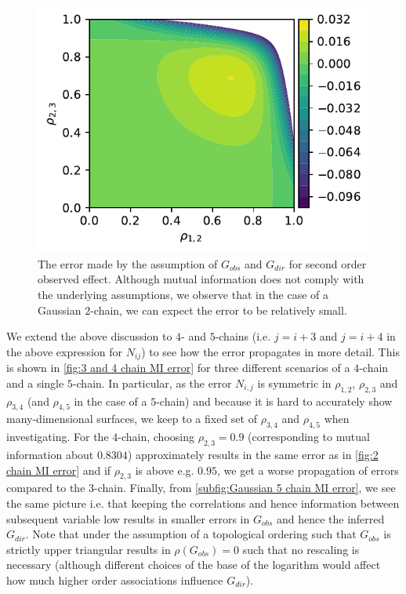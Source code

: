 \documentclass[../Thesis.tex]{subfiles}
\begin{document}
\begin{figure}[H]
    \centering
    \includegraphics[width=.7\linewidth]{figures/Gaussian Chain Theoretical/2 chain error - MI.pdf}
    \caption{The error made by the assumption of $G_{obs}$ and $G_{dir}$ for second order observed effect. Although mutual information does not comply with the underlying assumptions, we observe that in the case of a Gaussian $2$-chain, we can expect the error to be relatively small.}
    \label{fig:2 chain MI error}
\end{figure}

We extend the above discussion to $4$- and $5$-chains (i.e. $j = i + 3$ and $j = i + 4$ in the above expression for $N_{ij}$) to see how the error propagates in more detail. This is shown in \autoref{fig:3 and 4 chain MI error} for three different scenarios of a $4$-chain and a single $5$-chain. In particular, as the error $N_{i,j}$ is symmetric in $\rho_{1,2}$, $\rho_{2,3}$ and $\rho_{3,4}$ (and $\rho_{4,5}$ in the case of a $5$-chain) and because it is hard to accurately show many-dimensional surfaces, we keep to a fixed set of $\rho_{3,4}$ and $\rho_{4,5}$ when investigating. For the $4$-chain, choosing $\rho_{2,3} = 0.9$ (corresponding to mutual information about $0.8304$) approximately results in the same error as in \autoref{fig:2 chain MI error} and if $\rho_{2,3}$ is above e.g. $0.95$, we get a worse propagation of errors compared to the $3$-chain. Finally, from \autoref{subfig:Gaussian 5 chain MI error}, we see the same picture i.e. that keeping the correlations and hence information between subsequent variable low results in smaller errors in $G_{obs}$ and hence the inferred $G_{dir}$. Note that under the assumption of a topological ordering such that $G_{obs}$ is strictly upper triangular results in $\rho\left(G_{obs}\right) = 0$ such that no rescaling is necessary (although different choices of the base of the logarithm would affect how much higher order associations influence $G_{dir}$).
\end{document}
